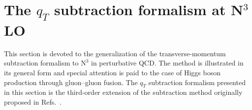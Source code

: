 \documentclass[12pt]{article}
\DeclareRobustCommand{\qt}{\ensuremath{q_T}\xspace}
\DeclareRobustCommand{\LO}{\text{LO}\xspace}
\DeclareRobustCommand{\N}[1]{\ensuremath{\text{N}^{#1}}} %
\begin{document}
\section{The \texorpdfstring{$\qt$}{qT} subtraction formalism at \texorpdfstring{N${}^\text{3}$LO}{N3LO}}
\label{sec:forma}

This section is devoted to the generalization of the transverse-momentum subtraction formalism to \N3\LO in perturbative QCD. The method is illustrated in its general form and special attention is paid to the case of Higgs boson production through gluon--gluon fusion. The $\qt$ subtraction formalism presented in this section is the third-order extension of the subtraction method originally proposed in Refs.~\cite{Catani:2007vq,Bozzi:2005wk,Bonciani:2015sha}.
\end{document}
